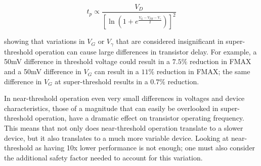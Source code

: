 \begin{equation}
\label{eqn:nth_delay}
t_p\propto\frac{V_D}{\left[\ln\left(1+e^\frac{V_G-V_{TH}-V_\gamma}{2}\right)\right]^2}
\end{equation}
 
 showing that variations in $V_G$ or $V_\gamma$ that are considered insignificant in super-threshold operation can cause large differences in transistor delay.
For example, a 50mV difference in threshold voltage could result in a $7.5\%$ reduction in FMAX and a 50mV difference in $V_G$ can result in a $11\%$ reduction in FMAX; the same difference in $V_G$ at super-threshold results in a $0.7\%$ reduction.

In near-threshold operation even very small differences in voltages and device characteristics, those of a magnitude that can easily be overlooked in super-threshold operation, have a dramatic effect on transistor operating frequency. 
This means that not only does near-threshold operation translate to a slower device, but it also translates to a much more variable device.
Looking at near-threshold as having 10x lower performance is not enough; one must also consider the additional safety factor needed to account for this variation.
